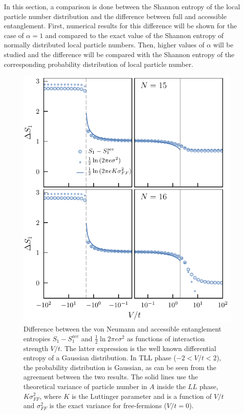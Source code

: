 In this section, a comparison is done between the Shannon entropy of the local particle number distribution and the difference between full and accessible entanglement. First, numerical results for this difference will be shown for the case of $\alpha=1$ and compared to the exact value of the Shannon entropy of normally distributed local particle numbers. Then, higher values of $\alpha$ will be studied and the difference will be compared with the Shannon entropy of the corresponding probability distribution of local particle number.

\begin{figure}[h!]
\begin{center}
\includegraphics[scale=1.0]{Images/deltaS1_N15N16.pdf}
\end{center}
\caption{Difference between the von Neumann and accessible entanglement entropies $S_{1}-S_{1}^{acc}$ and $\frac{1}{2} \ln 2 \pi e \sigma^2$ as functions of interaction strength $V/t$. The latter expression is the well known differential entropy of a Gaussian distribution. In TLL phase ($-2 < V/t < 2$), the probability distribution is Gaussian, as can be seen from the agreement between the two results. The solid lines use the theoretical variance of particle number in $A$ inside the $LL$ phase, $K \sigma^2_{FF}$, where $K$ is the Luttinger parameter and is a function of $V/t$ and $\sigma^2_{FF}$ is the exact variance for free-fermions ($V/t = 0$).}
\label{fig:deltaS1}
\end{figure}

